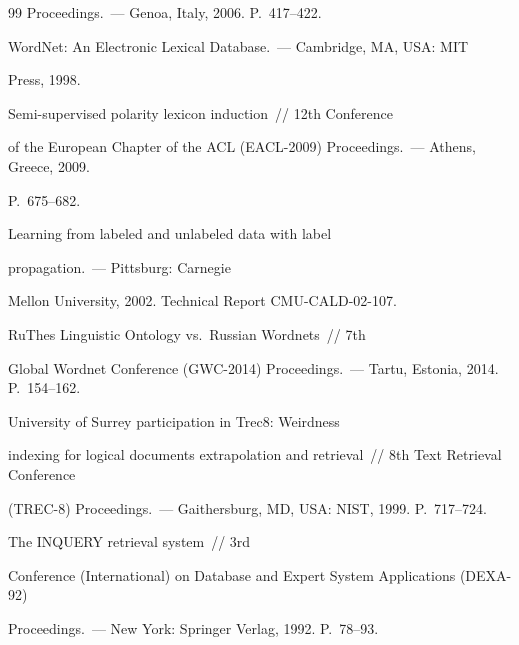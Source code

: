 {{\begin{thebibliography}{99}
Proceedings.~--- Genoa, Italy, 2006. P.~417--422.




 WordNet: An Electronic Lexical Database.~--- Cambridge, MA, USA: MIT


Press, 1998.




 Semi-supervised polarity lexicon induction~/\!\!/  12th Conference


of the European Chapter of the ACL (EACL-2009) Proceedings.~--- Athens, Greece, 2009.


P.~675--682.




 Learning from labeled and unlabeled data with label


propagation.~--- Pittsburg: Carnegie


Mellon University, 2002. Technical Report CMU-CALD-02-107.




 RuThes Linguistic Ontology vs.\ Russian Wordnets~/\!\!/ 7th


Global Wordnet Conference (GWC-2014) Proceedings.~--- Tartu, Estonia, 2014. P.~154--162.




 University of Surrey participation in Trec8: Weirdness


indexing for logical documents extrapolation and retrieval~/\!\!/ 8th Text Retrieval Conference


(TREC-8) Proceedings.~--- Gaithersburg, MD, USA: NIST, 1999. P.~717--724.




 The INQUERY retrieval system~/\!\!/ 3rd


Conference (International) on Database and Expert System Applications (DEXA-92)


Proceedings.~--- New York: Springer Verlag, 1992. P.~78--93.


\end{thebibliography}


} }








\vspace*{-6pt}





